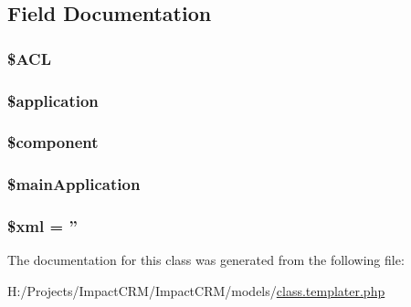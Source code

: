 \subsection{Field Documentation}
\hypertarget{classtemplater_a0e6e927aed984ad8947f77bf803b70bb}{
\subsubsection[{\$ACL}]{\setlength{\rightskip}{0pt plus 5cm}\${\bf ACL}}}
\label{classtemplater_a0e6e927aed984ad8947f77bf803b70bb}
\hypertarget{classtemplater_a537fa9b460dddc2a67074faab810398a}{
\subsubsection[{\$application}]{\setlength{\rightskip}{0pt plus 5cm}\$application}}
\label{classtemplater_a537fa9b460dddc2a67074faab810398a}
\hypertarget{classtemplater_a211527c21ba56109545060b49b628e59}{
\subsubsection[{\$component}]{\setlength{\rightskip}{0pt plus 5cm}\$component}}
\label{classtemplater_a211527c21ba56109545060b49b628e59}
\hypertarget{classtemplater_a83952ded4d59c57271c0cb128f7feb26}{
\subsubsection[{\$mainApplication}]{\setlength{\rightskip}{0pt plus 5cm}\$mainApplication}}
\label{classtemplater_a83952ded4d59c57271c0cb128f7feb26}
\hypertarget{classtemplater_aa108d9d91e700ac530401dd363b0723b}{
\subsubsection[{\$xml}]{\setlength{\rightskip}{0pt plus 5cm}\$xml = ''}}
\label{classtemplater_aa108d9d91e700ac530401dd363b0723b}


The documentation for this class was generated from the following file:\begin{DoxyCompactItemize}
\item 
H:/Projects/ImpactCRM/ImpactCRM/models/\hyperlink{class_8templater_8php}{class.templater.php}\end{DoxyCompactItemize}
